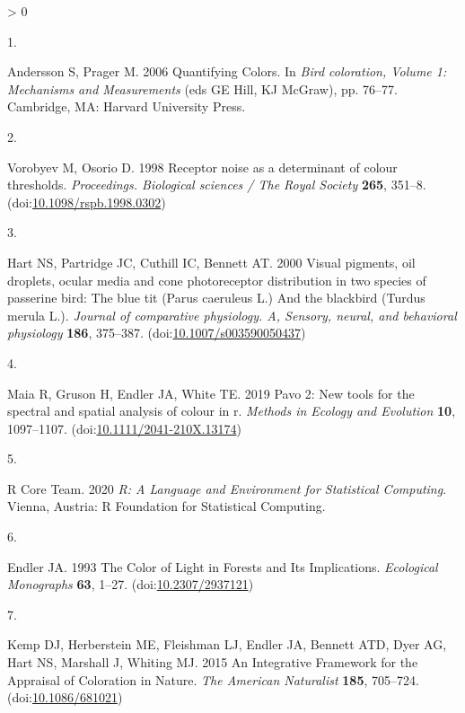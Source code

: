 \documentclass[
  a4paper,
]{article}
\newlength{\cslhangindent}
\newlength{\csllabelwidth}
\newenvironment{CSLReferences}[2] %
 {%
  \setlength{\parindent}{0pt}
  \ifodd #1 \everypar{\setlength{\hangindent}{\cslhangindent}}\ignorespaces\fi
  \ifnum #2 > 0
  \setlength{\parskip}{#2\baselineskip}
  \fi
 }%
 {}
\newcommand{\CSLLeftMargin}[1]{\parbox[t]{\csllabelwidth}{#1}}
\newcommand{\CSLRightInline}[1]{\parbox[t]{\linewidth - \csllabelwidth}{#1}\break}
\begin{document}
\hypertarget{refs}{}
\begin{CSLReferences}{0}{0}
\leavevmode\hypertarget{ref-andersson2006}{}%
\CSLLeftMargin{1. }
\CSLRightInline{Andersson S, Prager M. 2006 Quantifying {Colors}. In
\emph{Bird coloration, {Volume} 1: {Mechanisms} and {Measurements}} (eds
GE Hill, KJ McGraw), pp. 76--77. {Cambridge, MA}: {Harvard University
Press}. }

\leavevmode\hypertarget{ref-vorobyev1998}{}%
\CSLLeftMargin{2. }
\CSLRightInline{Vorobyev M, Osorio D. 1998 Receptor noise as a
determinant of colour thresholds. \emph{Proceedings. Biological sciences
/ The Royal Society} \textbf{265}, 351--8.
(doi:\href{https://doi.org/10.1098/rspb.1998.0302}{10.1098/rspb.1998.0302})}

\leavevmode\hypertarget{ref-hart2000}{}%
\CSLLeftMargin{3. }
\CSLRightInline{Hart NS, Partridge JC, Cuthill IC, Bennett AT. 2000
Visual pigments, oil droplets, ocular media and cone photoreceptor
distribution in two species of passerine bird: The blue tit ({Parus}
caeruleus {L}.) And the blackbird ({Turdus} merula {L}.). \emph{Journal
of comparative physiology. A, Sensory, neural, and behavioral
physiology} \textbf{186}, 375--387.
(doi:\href{https://doi.org/10.1007/s003590050437}{10.1007/s003590050437})}

\leavevmode\hypertarget{ref-maia2019}{}%
\CSLLeftMargin{4. }
\CSLRightInline{Maia R, Gruson H, Endler JA, White TE. 2019 Pavo 2:
{New} tools for the spectral and spatial analysis of colour in r.
\emph{Methods in Ecology and Evolution} \textbf{10}, 1097--1107.
(doi:\href{https://doi.org/10.1111/2041-210X.13174}{10.1111/2041-210X.13174})}

\leavevmode\hypertarget{ref-rcoreteam2020}{}%
\CSLLeftMargin{5. }
\CSLRightInline{R Core Team. 2020 \emph{R: {A Language} and
{Environment} for {Statistical Computing}}. {Vienna, Austria}: {R
Foundation for Statistical Computing}. }

\leavevmode\hypertarget{ref-endler1993}{}%
\CSLLeftMargin{6. }
\CSLRightInline{Endler JA. 1993 The {Color} of {Light} in {Forests} and
{Its Implications}. \emph{Ecological Monographs} \textbf{63}, 1--27.
(doi:\href{https://doi.org/10.2307/2937121}{10.2307/2937121})}

\leavevmode\hypertarget{ref-kemp2015}{}%
\CSLLeftMargin{7. }
\CSLRightInline{Kemp DJ, Herberstein ME, Fleishman LJ, Endler JA,
Bennett ATD, Dyer AG, Hart NS, Marshall J, Whiting MJ. 2015 An
{Integrative Framework} for the {Appraisal} of {Coloration} in {Nature}.
\emph{The American Naturalist} \textbf{185}, 705--724.
(doi:\href{https://doi.org/10.1086/681021}{10.1086/681021})}


\end{CSLReferences}
\end{document}
